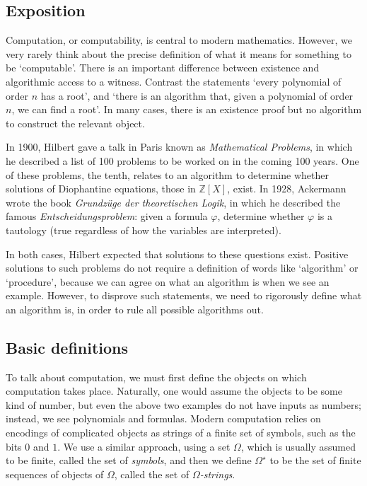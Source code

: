 \subsection{Exposition}
Computation, or computability, is central to modern mathematics.
However, we very rarely think about the precise definition of what it means for something to be `computable'.
There is an important difference between existence and algorithmic access to a witness.
Contrast the statements `every polynomial of order \( n \) has a root', and `there is an algorithm that, given a polynomial of order \( n \), we can find a root'.
In many cases, there is an existence proof but no algorithm to construct the relevant object.

In 1900, Hilbert gave a talk in Paris known as \emph{Mathematical Problems}, in which he described a list of 100 problems to be worked on in the coming 100 years.
One of these problems, the tenth, relates to an algorithm to determine whether solutions of Diophantine equations, those in \( \mathbb Z[X] \), exist.
In 1928, Ackermann wrote the book \emph{Grundz\"uge der theoretischen Logik}, in which he described the famous \emph{Entscheidungsproblem}: given a formula \( \varphi \), determine whether \( \varphi \) is a tautology (true regardless of how the variables are interpreted).

In both cases, Hilbert expected that solutions to these questions exist.
Positive solutions to such problems do not require a definition of words like `algorithm' or `procedure', because we can agree on what an algorithm is when we see an example.
However, to disprove such statements, we need to rigorously define what an algorithm is, in order to rule all possible algorithms out.

\subsection{Basic definitions}
To talk about computation, we must first define the objects on which computation takes place.
Naturally, one would assume the objects to be some kind of number, but even the above two examples do not have inputs as numbers; instead, we see polynomials and formulas.
Modern computation relies on encodings of complicated objects as strings of a finite set of symbols, such as the bits \( 0 \) and \( 1 \).
We use a similar approach, using a set \( \Omega \), which is usually assumed to be finite, called the set of \emph{symbols}, and then we define \( \Omega^\star \) to be the set of finite sequences of objects of \( \Omega \), called the set of \( \Omega \)\emph{-strings}.


